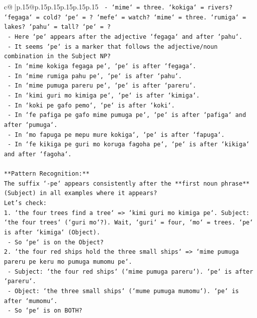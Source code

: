 \documentclass{article}
\begin{document}
{\begin{supertabular}{c@{$\;$}|p{.15\linewidth}@{}p{.15\linewidth}p{.15\linewidth}p{.15\linewidth}p{.15\linewidth}p{.15\linewidth}}
{{{\texttt{      {-} `mime` = three. `kokiga` = rivers? `fegaga` = cold? `pe` = ? `mefe` = watch? `mime` = three. `rumiga` = lakes? `pahu` = tall? `pe` = ?} \\
\texttt{      {-} Here `pe` appears after the adjective `fegaga` and after `pahu`.} \\
\texttt{      {-} It seems `pe` is a marker that follows the adjective/noun combination in the Subject NP?} \\
\texttt{      {-} In `mime kokiga fegaga pe`, `pe` is after `fegaga`.} \\
\texttt{      {-} In `mime rumiga pahu pe`, `pe` is after `pahu`.} \\
\texttt{      {-} In `mime pumuga pareru pe`, `pe` is after `pareru`.} \\
\texttt{      {-} In `kimi guri mo kimiga pe`, `pe` is after `kimiga`.} \\
\texttt{      {-} In `koki pe gafo pemo`, `pe` is after `koki`.} \\
\texttt{      {-} In `fe pafiga pe gafo mime pumuga pe`, `pe` is after `pafiga` and after `pumuga`.} \\
\texttt{      {-} In `mo fapuga pe mepu mure kokiga`, `pe` is after `fapuga`.} \\
\texttt{      {-} In `fe kikiga pe guri mo koruga fagoha pe`, `pe` is after `kikiga` and after `fagoha`.} \\
\\ 
\texttt{**Pattern Recognition:**} \\
\texttt{The suffix `{-}pe` appears consistently after the **first noun phrase** (Subject) in all examples where it appears?} \\
\texttt{Let's check:} \\
\texttt{1. `the four trees find a tree` => `kimi guri mo kimiga pe`. Subject: `the four trees` (`guri mo`?). Wait, `guri` = four, `mo` = trees. `pe` is after `kimiga` (Object).} \\
\texttt{   {-} So `pe` is on the Object?} \\
\texttt{2. `the four red ships hold the three small ships` => `mime pumuga pareru pe keru mo pumuga mumomu pe`.} \\
\texttt{   {-} Subject: `the four red ships` (`mime pumuga pareru`). `pe` is after `pareru`.} \\
\texttt{   {-} Object: `the three small ships` (`mume pumuga mumomu`). `pe` is after `mumomu`.} \\
\texttt{   {-} So `pe` is on BOTH?} \\
}}}
\end{supertabular}}
\end{document}
